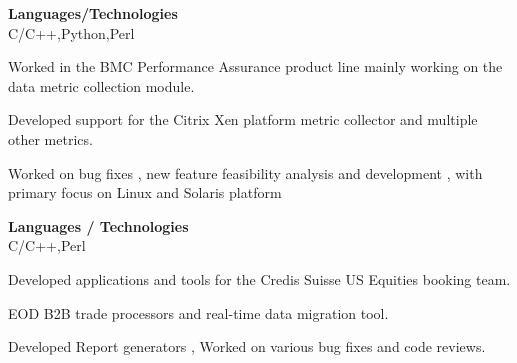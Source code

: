 \documentclass[a4,10pt]{cv4tw}
\begin{document}
                                                {\textbf{Languages/Technologies} \\ C/C++,Python,Perl}
                                                {
                                                    \begin{missions}
                                                    \item Worked  in the BMC Performance Assurance product line mainly working on the data metric collection module.
                                                    \item Developed support for the Citrix Xen platform metric collector and multiple other metrics.
                                                    \item Worked  on bug fixes , new feature feasibility analysis and development , with primary focus on Linux and Solaris platform
                                                    \end{missions}
                                                    }

                                                    {\textbf{Languages / Technologies } \\ C/C++,Perl}
                                                    {
                                                        \begin{missions}
                                                        \item Developed applications and tools for the Credis Suisse US Equities booking team.
                                                        \item EOD B2B trade processors and real-time data migration tool.
                                                        \item Developed Report generators , Worked on various bug fixes and code reviews.
                                                        \end{missions}
                                                        }
\end{document}
